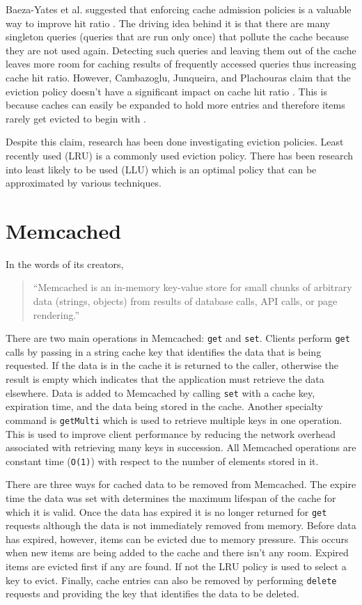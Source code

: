 \documentclass[12pt]{ucthesis}
\begin{document}
Baeza-Yates et al. suggested that enforcing cache admission policies is a valuable way to improve hit ratio \cite{cacheAdmissionPolicies}.
The driving idea behind it is that there are many singleton queries (queries that are run only once) that pollute the cache because they are not used again.
Detecting such queries and leaving them out of the cache leaves more room for caching results of frequently accessed queries thus increasing cache hit ratio.
However, Cambazoglu, Junqueira, and Plachouras claim that the eviction policy doesn't have a significant impact on cache hit ratio \cite{refreshingPerspectiveSearch}.
This is because caches can easily be expanded to hold more entries and therefore items rarely get evicted to begin with \cite{refreshingPerspectiveSearch}.

Despite this claim, research has been done investigating eviction policies.
Least recently used (LRU) is a commonly used eviction policy.
There has been research into least likely to be used (LLU) which is an optimal policy that can be approximated by various techniques.


\section{Memcached}
In the words of its creators, \begin{quotation}``Memcached is an in-memory key-value store for small chunks of arbitrary data (strings, objects) from results of database calls, API calls, or page rendering.\cite{memcachedDotOrg}''\end{quotation}
There are two main operations in {\textsf Memcached}: {\tt get} and {\tt set}.
Clients perform {\tt get} calls by passing in a string cache key that identifies the data that is being requested.
If the data is in the cache it is returned to the caller, otherwise the result is empty which indicates that the application must retrieve the data elsewhere.
Data is added to {\textsf Memcached} by calling {\tt set} with a cache key, expiration time, and the data being stored in the cache.
Another specialty command is {\tt getMulti} which is used to retrieve multiple keys in one operation.
This is used to improve client performance by reducing the network overhead associated with retrieving many keys in succession.
All {\textsf Memcached} operations are constant time ({\tt O(1)}) with respect to the number of elements stored in it.

There are three ways for cached data to be removed from {\textsf Memcached}.
The expire time the data was set with determines the maximum lifespan of the cache for which it is valid.
Once the data has expired it is no longer returned for {\tt get} requests although the data is not immediately removed from memory.
Before data has expired, however, items can be evicted due to memory pressure.
This occurs when new items are being added to the cache and there isn't any room.
Expired items are evicted first if any are found.
If not the LRU policy is used to select a key to evict.
Finally, cache entries can also be removed by performing {\tt delete} requests and providing the key that identifies the data to be deleted.
\end{document}
